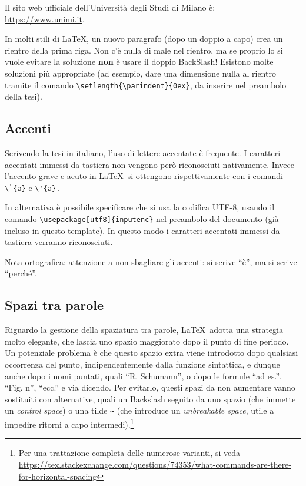 \documentclass[12pt]{report}
\begin{document}
    Il sito web ufficiale dell'Università degli Studi di Milano è:\\
    \url{https://www.unimi.it}.

    In molti stili di \LaTeX, un nuovo paragrafo (dopo un doppio a capo) crea un rientro della prima riga. Non c'\`e nulla di male nel rientro, ma se proprio lo si vuole evitare la soluzione \textbf{non} \`e usare il doppio BackSlash! Esistono molte soluzioni pi\`u appropriate (ad esempio, dare una dimensione nulla al rientro tramite il comando \verb|\setlength{\parindent}{0ex}|, da inserire nel preambolo della tesi).

    \subsection{Accenti}

    Scrivendo la tesi in italiano, l'uso di lettere accentate \`e frequente. I caratteri accentati immessi da tastiera non vengono per\`o riconosciuti nativamente. Invece l'accento grave e acuto in \LaTeX\ si ottengono rispettivamente con i comandi \verb|\`{a}| e \verb|\'{a}.|

    In alternativa \`e possibile specificare che si usa la codifica UTF-8, usando il comando \verb|\usepackage[utf8]{inputenc}| nel preambolo del documento (già incluso in questo template). In questo modo i caratteri accentati immessi da tastiera verranno riconosciuti.

    Nota ortografica: attenzione a non sbagliare gli accenti: si scrive ``\`e'', ma si scrive ``perch\'e''.

    \subsection{Spazi tra parole}

    Riguardo la gestione della spaziatura tra parole, \LaTeX\ adotta una strategia molto elegante, che lascia uno spazio maggiorato dopo il punto di fine periodo. Un potenziale problema è che questo spazio extra viene introdotto dopo qualsiasi occorrenza del punto, indipendentemente dalla funzione sintattica, e dunque anche dopo i nomi puntati, quali ``R. Schumann'', o dopo le formule ``ad es.'', ``Fig. n'', ``ecc.'' e via dicendo. Per evitarlo, questi spazi da non aumentare vanno sostituiti con alternative, quali un Backslash seguito da uno spazio (che immette un \textit{control space}) o una tilde \verb|~| (che introduce un \textit{unbreakable space}, utile a impedire ritorni a capo intermedi).\footnote{Per una trattazione completa delle numerose varianti, si veda \url{https://tex.stackexchange.com/questions/74353/what-commands-are-there-for-horizontal-spacing}}
\end{document}
